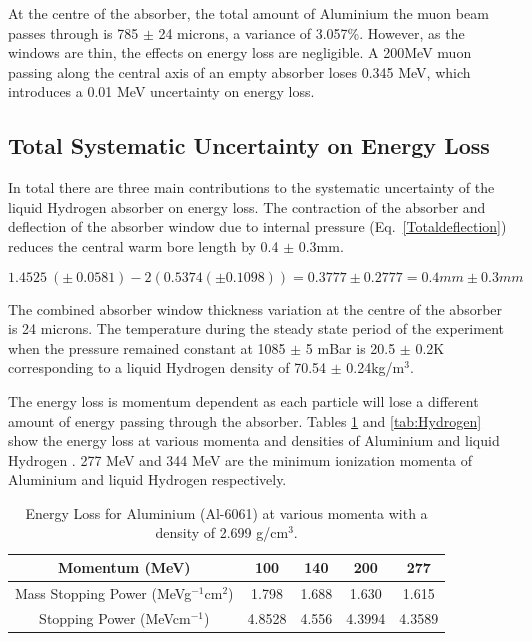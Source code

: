 At the centre of the absorber, the
total amount of Aluminium the muon beam passes through is 785 $\mathrm{\pm}$ 24 microns, a variance of
3.057\%. However, as the windows are thin, the effects on energy loss are negligible. A 200MeV muon passing
along the central axis of an empty absorber loses 0.345 MeV, which introduces a 0.01 MeV uncertainty on
energy loss.


\subsection{Total Systematic Uncertainty on Energy Loss}
\label{SubSect:Absorber_total}

In total there are three main contributions to the systematic uncertainty of the liquid Hydrogen absorber on energy loss. The contraction of the absorber and deflection of the absorber window due to internal pressure (Eq.~\ref{Totaldeflection}) reduces the central warm bore length by 0.4 $\mathrm{\pm}$ 0.3mm.

\begin{equation}
    1.4525\ \left(\pm \ 0.0581\right)-2\left(0.5374\left(\pm 0.1098\right)\right)=0.3777\pm 0.2777=0.4mm\pm 0.3mm
\label{Totaldeflection}    
\end{equation}

The combined absorber window thickness variation at the centre of the absorber is 24 microns. The temperature during the steady state period of the experiment when the pressure remained constant at 1085 $\mathrm{\pm}$ 5 mBar is 20.5 $\mathrm{\pm}$ 0.2K corresponding to a liquid Hydrogen density of 70.54 $\mathrm{\pm}$ 0.24kg/m${}^{3}$.

The energy loss is momentum dependent as each particle will lose a different amount of energy passing through the absorber. Tables \ref{tab:Aluminium} and \ref{tab:Hydrogen} show the energy loss at various momenta and densities of Aluminium and liquid Hydrogen \cite{AtomicAluminium} \cite{AtomicHydrogen} \cite{MuonAluminium} \cite{MuonliquidHydrogen}. 277 MeV and 344 MeV are the minimum ionization momenta of Aluminium and liquid Hydrogen respectively.


\begin{table}[h]
  \caption{
    Energy Loss for Aluminium (Al-6061) at various momenta with a density of 2.699 g/cm${}^{3}$.
  }
  \label{tab:Aluminium}
  \begin{center}
    \begin{tabular}{|c c c c c|}
    \hline

Momentum (MeV) & 100 & 140 & 200 & 277     \rule{0pt}{14pt} \\
\hline
{Mass Stopping Power (MeVg${}^{-1}$cm${}^{2}$)} & 1.798 & 1.688 & 1.630 & 1.615
\\
{Stopping Power (MeVcm${}^{-1}$)} & 4.8528 & 4.556 & 4.3994 & 4.3589
\\

    \hline
    \end{tabular}
  \end{center}
\end{table} 

